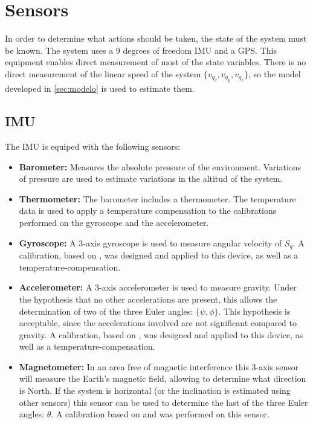\documentclass[conference]{IEEEtran}
\begin{document}
\section{Sensors}

In order to determine what actions should be taken, the state of the system must be known. The system uses a 9 degrees of freedom IMU and a GPS. This equipment enables direct measurement of most of the state variables. There is no direct measurement of the linear speed of the system $\{v_{q_z},v_{q_y},v_{q_z}\}$, so the model developed in \ref{sec:modelo} is used to estimate them.

\subsection{IMU}
\label{sec:sensors-imu}

The IMU is equiped with the following sensors:
\begin{itemize}
\item \textbf{Barometer:} Measures the absolute pressure of the environment. Variations of pressure are used to estimate variations in the altitud of the system.
\item \textbf{Thermometer:} The barometer includes a thermometer. The temperature data is used to apply a temperature compensation to the calibrations performed on the gyroscope and the accelerometer.
\item \textbf{Gyroscope:} A 3-axis gyroscope is used to measure angular velocity of $S_q$. A calibration, based on \cite{bib:calib_imu}, was designed and applied to this device, as well as a temperature-compensation.
\item \textbf{Accelerometer:} A 3-axis accelerometer is used to measure gravity. Under the hypothesis that no other accelerations are present, this allows the determination of two of the three Euler angles: $\{\psi, \phi\}$. This hypothesis is acceptable, since the accelerations involved are not significant compared to gravity. A calibration, based on \cite{bib:calib_imu}, was designed and applied to this device, as well as a temperature-compensation.
\item \textbf{Magnetometer:} In an area free of magnetic interference this 3-axis sensor will measure the Earth's magnetic field, allowing to determine what direction is North. If the system is horizontal (or the inclination is estimated using other sensors) this sensor can be used to determine the last of the three Euler angles: $\theta$. A calibration based on \cite{bib:bola} and \cite{bib:alain} was performed on this sensor.
\end{itemize}
\end{document}
